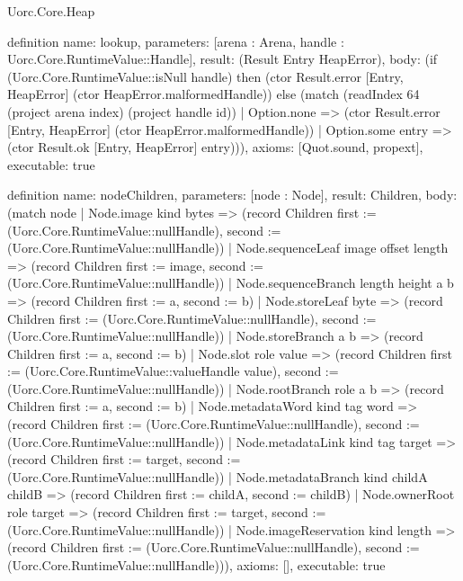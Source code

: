 \begin{lexlean}{Uorc.Core.Heap}
\begin{semanticmodule}
definition{
  name: lookup,
  parameters: [arena : Arena, handle : Uorc.Core.RuntimeValue::Handle],
  result: (Result Entry HeapError),
  body: (if (Uorc.Core.RuntimeValue::isNull handle) then (ctor Result.error [Entry, HeapError] (ctor HeapError.malformedHandle)) else (match (readIndex 64 (project arena index) (project handle id))
    | Option.none => (ctor Result.error [Entry, HeapError] (ctor HeapError.malformedHandle))
    | Option.some entry => (ctor Result.ok [Entry, HeapError] entry))),
  axioms: [Quot.sound, propext],
  executable: true
}

definition{
  name: nodeChildren,
  parameters: [node : Node],
  result: Children,
  body: (match node
    | Node.image kind bytes => (record Children {first := (Uorc.Core.RuntimeValue::nullHandle), second := (Uorc.Core.RuntimeValue::nullHandle)})
    | Node.sequenceLeaf image offset length => (record Children {first := image, second := (Uorc.Core.RuntimeValue::nullHandle)})
    | Node.sequenceBranch length height a b => (record Children {first := a, second := b})
    | Node.storeLeaf byte => (record Children {first := (Uorc.Core.RuntimeValue::nullHandle), second := (Uorc.Core.RuntimeValue::nullHandle)})
    | Node.storeBranch a b => (record Children {first := a, second := b})
    | Node.slot role value => (record Children {first := (Uorc.Core.RuntimeValue::valueHandle value), second := (Uorc.Core.RuntimeValue::nullHandle)})
    | Node.rootBranch role a b => (record Children {first := a, second := b})
    | Node.metadataWord kind tag word => (record Children {first := (Uorc.Core.RuntimeValue::nullHandle), second := (Uorc.Core.RuntimeValue::nullHandle)})
    | Node.metadataLink kind tag target => (record Children {first := target, second := (Uorc.Core.RuntimeValue::nullHandle)})
    | Node.metadataBranch kind childA childB => (record Children {first := childA, second := childB})
    | Node.ownerRoot role target => (record Children {first := target, second := (Uorc.Core.RuntimeValue::nullHandle)})
    | Node.imageReservation kind length => (record Children {first := (Uorc.Core.RuntimeValue::nullHandle), second := (Uorc.Core.RuntimeValue::nullHandle)})),
  axioms: [],
  executable: true
}


\end{semanticmodule}
\end{lexlean}
